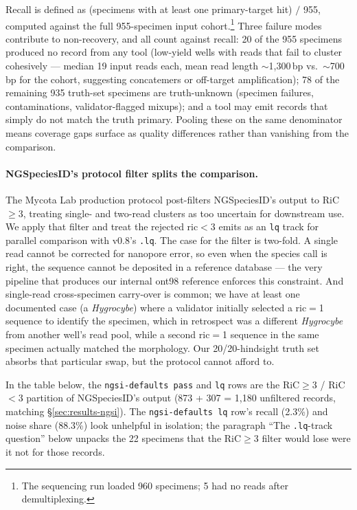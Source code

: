 \documentclass[11pt]{article}
\begin{document}
Recall is defined as (specimens with at least one primary-target hit)
$/$ 955, computed against the full 955-specimen input
cohort.\footnote{The sequencing run loaded 960 specimens; 5 had no
reads after demultiplexing.} Three failure modes contribute to
non-recovery, and all count against recall: 20 of the 955 specimens
produced no record from any tool (low-yield wells with reads that fail
to cluster cohesively --- median 19 input reads each, mean read length
$\sim$1{,}300\,bp vs.~$\sim$700\,bp for the cohort, suggesting
concatemers or off-target amplification); 78 of the remaining
935 truth-set specimens are truth-unknown (specimen failures,
contaminations, validator-flagged mixups); and a tool may emit records
that simply do not match the truth primary. Pooling these on the same
denominator means coverage gaps surface as quality differences rather
than vanishing from the comparison.

\paragraph{NGSpeciesID's protocol filter splits the comparison.}
The Mycota Lab production protocol post-filters NGSpeciesID's output
to RiC$\geq$3, treating single- and two-read clusters as too uncertain
for downstream use. We apply that filter and treat the rejected
ric$<$3 emits as an \texttt{lq} track for parallel comparison with
v0.8's \texttt{.lq}. The case for the filter is two-fold. A single
read cannot be corrected for nanopore error, so even when the species
call is right, the sequence cannot be deposited in a reference
database --- the very pipeline that produces our internal ont98
reference enforces this constraint. And single-read cross-specimen
carry-over is common; we have at least one documented case (a
\emph{Hygrocybe}) where a validator initially selected a ric$=$1
sequence to identify the specimen, which in retrospect was a different
\emph{Hygrocybe} from another well's read pool, while a second ric$=$1
sequence in the same specimen actually matched the morphology. Our
20/20-hindsight truth set absorbs that particular swap, but the
protocol cannot afford to.

In the table below, the \texttt{ngsi-defaults pass} and \texttt{lq} rows
are the RiC$\geq$3 / RiC$<$3 partition of NGSpeciesID's output (873 +
307 = 1,180 unfiltered records, matching §\ref{sec:results-ngsi}). The
\texttt{ngsi-defaults lq} row's recall (2.3\%) and noise share (88.3\%)
look unhelpful in isolation; the paragraph ``The \texttt{.lq}-track
question'' below unpacks the 22 specimens that the RiC$\geq$3 filter
would lose were it not for those records.
\end{document}
